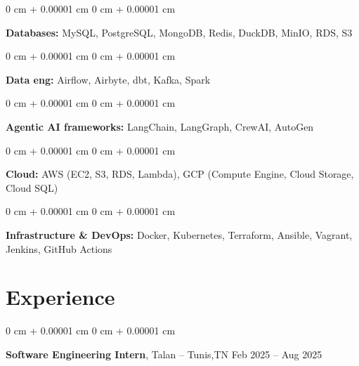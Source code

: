 \documentclass[10pt, letterpaper]{article}
\newenvironment{onecolentry}{
  \begin{adjustwidth}{
      0 cm + 0.00001 cm
    }{
      0 cm + 0.00001 cm
    }
  }{
  \end{adjustwidth}
} %
\newenvironment{twocolentry}[2][]{
  \onecolentry
  \def\secondColumn{#2}
  \setcolumnwidth{\fill, 4.5 cm}
  \begin{paracol}{2}
  }{
    \switchcolumn \raggedleft \secondColumn
  \end{paracol}
  \end{onecolentry}
} %
\begin{document}
  \vspace{0.2 cm}

  \begin{onecolentry}
    \textbf{Databases:} MySQL, PostgreSQL, MongoDB, Redis, DuckDB, MinIO, RDS, S3
  \end{onecolentry}

  \vspace{0.2 cm}

  \begin{onecolentry}
    \textbf{Data eng: }  Airflow, Airbyte, dbt, Kafka, Spark
  \end{onecolentry}

  \vspace{0.2 cm}

  \begin{onecolentry}
    \textbf{Agentic AI frameworks:} LangChain, LangGraph, CrewAI, AutoGen
  \end{onecolentry}

  \vspace{0.2 cm}


  \begin{onecolentry}
    \textbf{Cloud:} AWS (EC2, S3, RDS, Lambda), GCP (Compute Engine, Cloud Storage, Cloud SQL)
  \end{onecolentry}

  \vspace{0.2 cm}


  \begin{onecolentry}
    \textbf{Infrastructure & DevOps:} Docker, Kubernetes, Terraform, Ansible, Vagrant, Jenkins, GitHub Actions
  \end{onecolentry}


\section{Experience}




\begin{twocolentry}{
    Feb 2025 – Aug 2025
  }
\textbf{Software Engineering Intern}, Talan -- Tunis,TN\end{twocolentry}
\end{document}
